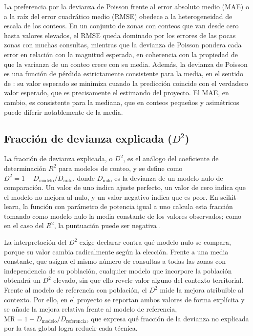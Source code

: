 La preferencia por la devianza de Poisson frente al error absoluto medio (MAE) o a la raíz
del error cuadrático medio (RMSE) obedece a la heterogeneidad de escala de los conteos. En un
conjunto de zonas con conteos que van desde cero hasta valores elevados, el RMSE queda
dominado por los errores de las pocas zonas con muchas consultas, mientras que la devianza
de Poisson pondera cada error en relación con la magnitud esperada, en coherencia con la
propiedad de que la varianza de un conteo crece con su media. Además, la devianza de Poisson
es una función de pérdida estrictamente consistente para la media, en el sentido de
\textcite{gneiting2011}: su valor esperado se minimiza cuando la predicción coincide con el
verdadero valor esperado, que es precisamente el estimando del proyecto. El MAE, en cambio,
es consistente para la mediana, que en conteos pequeños y asimétricos puede diferir
notablemente de la media.

\subsection{Fracción de devianza explicada (\texorpdfstring{$D^2$}{D²})}
\label{subsec:d2}

La fracción de devianza explicada, o $D^2$, es el análogo del coeficiente de determinación
$R^2$ para modelos de conteo, y se define como
$D^2 = 1 - D_{\mathrm{modelo}} / D_{\mathrm{nulo}}$, donde $D_{\mathrm{nulo}}$ es la devianza
de un modelo nulo de comparación. Un valor de uno indica ajuste perfecto, un valor de cero
indica que el modelo no mejora al nulo, y un valor negativo indica que es peor. En
scikit-learn, la función  con parámetro de potencia igual a uno calcula
esta fracción tomando como modelo nulo la media constante de los valores observados; como en
el caso del $R^2$, la puntuación puede ser negativa \parencite{sklearn-d2}.

La interpretación del $D^2$ exige declarar contra qué modelo nulo se compara, porque su valor
cambia radicalmente según la elección. Frente a una media constante, que asigna el mismo
número de consultas a todas las zonas con independencia de su población, cualquier modelo
que incorpore la población obtendrá un $D^2$ elevado, sin que ello revele valor alguno del
contexto territorial. Frente al modelo de referencia con población, el $D^2$ mide la mejora
atribuible al contexto. Por ello, en el proyecto se reportan ambos valores de forma
explícita y se añade la mejora relativa frente al modelo de referencia,
$\mathrm{MR} = 1 - D_{\mathrm{modelo}} / D_{\mathrm{referencia}}$, que expresa qué fracción
de la devianza no explicada por la tasa global logra reducir cada técnica.

